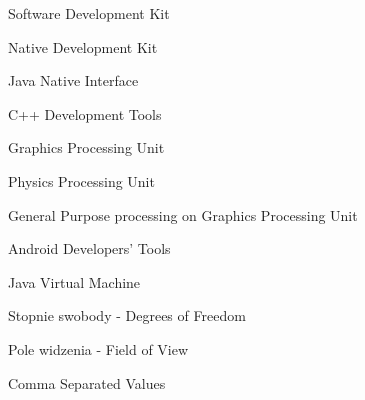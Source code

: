 \suppressfloats[t]

\begin{description}[\setleftmargin{65pt}\setlabelstyle{\bfseries}]
    \leftskip=1cm

	\item[$SDK$]      	Software Development Kit
    \item[$NDK$]      	Native Development Kit
    \item[$JNI$]      	Java Native Interface
    \item[$CDT$]        C++ Development Tools
    \item[$GPU$]		Graphics Processing Unit
    \item[$PPU$]        Physics Processing Unit
    \item[$GPGPU$]      General Purpose processing on Graphics Processing Unit
    \item[$ADT$]        Android Developers' Tools
    \item[$JVM$]        Java Virtual Machine
    \item[$DoF$]        Stopnie swobody - Degrees of Freedom
    \item[$FoV$]		Pole widzenia - Field of View
    \item[$CSV$]		Comma Separated Values
\end{description}
